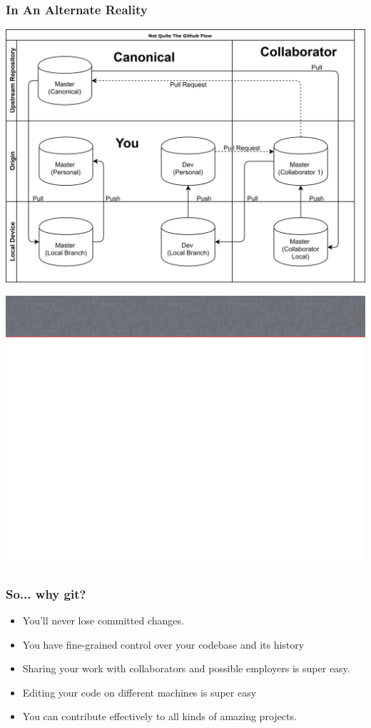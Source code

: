 \documentclass[unknownkeysallowed]{beamer}
\begin{document}
\begin{frame}
    \vspace{.25cm}
    \frametitle{In An Alternate Reality}
	\begin{center}
	\includegraphics[width = .8\linewidth]{assets/thenextlevel}
	\end{center}
    \vspace{.25cm}
\end{frame}

{\includegraphics[width=\paperwidth,height=\paperheight]{assets/slide_bg}}

\begin{frame}
    \frametitle{So... why git?}
    \begin{itemize}
        \item{You'll never lose committed changes.}
        \item{You have fine-grained control over your codebase and its history}
        \item{Sharing your work with collaborators and possible employers is super easy.}
        \item{Editing your code on different machines is super easy}
        \item{You can contribute effectively to all kinds of amazing projects.}
    \end{itemize}
\end{frame}
\end{document}
